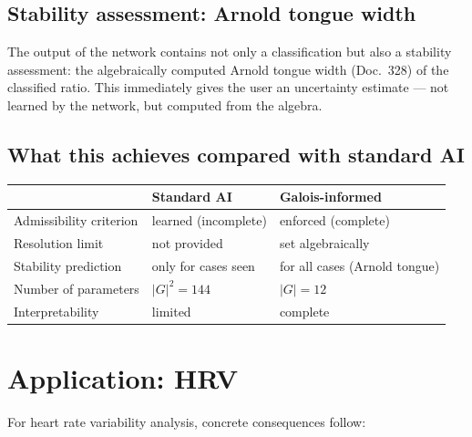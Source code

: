 \subsection*{Stability assessment: Arnold tongue width}

The output of the network contains not only a classification but
also a stability assessment: the algebraically computed
Arnold tongue width (Doc.~328) of the classified ratio.
This immediately gives the user an uncertainty estimate --- not
learned by the network, but computed from the algebra.

\subsection*{What this achieves compared with standard AI}

\begin{center}
\begin{tabular}{@{}lll@{}}
\toprule
& Standard AI & Galois-informed \\
\midrule
Admissibility criterion & learned (incomplete) & enforced (complete) \\
Resolution limit & not provided & set algebraically \\
Stability prediction & only for cases seen & for all cases (Arnold tongue) \\
Number of parameters & $|G|^2 = 144$ & $|G| = 12$ \\
Interpretability & limited & complete \\
\bottomrule
\end{tabular}
\end{center}

\section{Application: HRV}

For heart rate variability analysis, concrete consequences follow:

